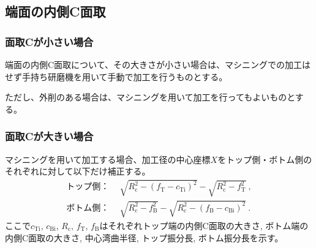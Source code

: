 \subsection{端面の内側C面取}

\subsubsection{面取Cが小さい場合}
端面の内側C面取について、その大きさが小さい場合は、マシニングでの加工はせず手持ち研磨機を用いて手動で加工を行うものとする。

ただし、外削のある場合は、マシニングを用いて加工を行ってもよいものとする。

\subsubsection{面取Cが大きい場合}
マシニングを用いて加工する場合、加工径の中心座標$X$をトップ側・ボトム側のそれぞれに対して以下だけ補正する。
\begin{align*}
  \text{トップ側：}&~~
  \sqrt{R_\mathrm c^2-\left(f_\mathrm T-c_\mathrm{Ti}\right)^2}-\sqrt{R_\mathrm c^2-f_\mathrm T^2}\ ,\\
  \text{ボトム側：}&~~
  \sqrt{R_\mathrm c^2-f_\mathrm B^2}-\sqrt{R_\mathrm c^2-\left(f_\mathrm B-c_\mathrm{Bi}\right)^2}\ .
\end{align*}
ここで$c_\mathrm{Ti}$, $c_\mathrm{Bi}$, $R_\mathrm c$, $f_\mathrm T$, $f_\mathrm B$はそれぞれトップ端の内側C面取の大きさ, ボトム端の内側C面取の大きさ, 中心湾曲半径, トップ振分長, ボトム振分長を示す。



\clearpage


